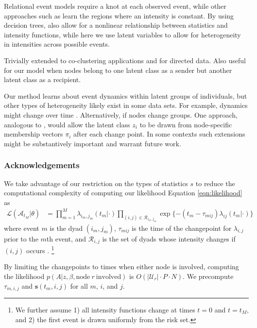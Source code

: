 \documentclass{article}
\begin{document}
Relational event models \cite{Butts2008} require a knot at each observed event, while other approaches such as \cite{Gunawardana2011} learn the regions where an intensity is constant.  By using decision trees,  \cite{Gunawardana2011} also allow for a nonlinear relationship between statistics and intensity functions, while here we use latent variables to allow for heterogeneity in intensities across possible events.

Trivially extended to co-clustering applications and for directed data.  Also useful for our model when nodes belong to one latent class as a sender but another latent class as a recipient.

Our method learns about event dynamics within latent groups of individuals, but other types of heterogeneity likely exist in some data sets.  For example, dynamics might change over time \cite{Vu2011}.  Alternatively, if nodes change groups.  One approach, analogous to \cite{Airoldi2008}, would allow the latent class $z_i$ to be drawn from node-specific membership vectors $\pi_i$  after each change point.  In some contexts such extensions might be substantively important and warrant future work.

\subsubsection*{Acknowledgements}





We take advantage of our restriction on the types of statistics $s$ to reduce the computational complexity of computing our likelihood
 Equation \ref{eqn:likelihood} as 
\begin{align*}
\mathcal{L}(\mathcal{A}_{t_M}|\theta) &= \prod_{m=1}^M \lambda_{i_m,j_m}(t_m|\cdot) \prod_{(i,j) \in \mathcal{R}_{i_m,j_m}}\exp\{ - (t_m - \tau_{mij}) \lambda_{ij}(t_m | \cdot) \}
\end{align*}
\noindent where event $m$ is the dyad $(i_m,j_m)$, $\tau_{mij}$ is the time  of the changepoint for $\lambda_{i,j}$ prior to the $m$th event, and $\mathcal{R}_{i,j}$ is the set of dyads whose intensity changes if $(i,j)$ occurs  \cite{Butts2008}. \footnote{We further assume 1) all intensity functions change at times $t=0$ and $t=t_M$, and 2) the first event is drawn uniformly from the risk set.}

 By limiting the changepoints to times when either node is involved, computing the likelihood $p(A|z,\beta,\mbox{node} \ r \ \mbox{involved})$ is $O(|\mathcal{U}_r| \cdot P \cdot N)$.  We precompute $\tau_{m,i,j}$ and $\mathbf{s}(t_m,i,j)$ for all $m$, $i$, and $j$. 
\end{document}
